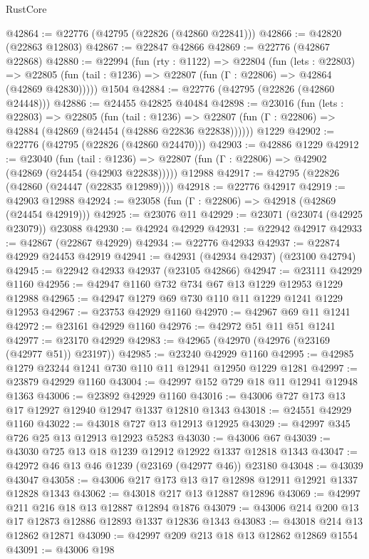 \begin{lexlean}{RustCore}
\begin{coremodule}
@42864 := @22776 (@42795 (@22826 (@42860 @22841)))
@42866 := @42820 (@22863 @12803)
@42867 := @22847 @42866
@42869 := @22776 (@42867 @22868)
@42880 := @22994
    (fun (rty : @1122) =>
    @22804
      (fun (lets : @22803) =>
      @22805 (fun (tail : @1236) => @22807 (fun (Γ : @22806) => @42864 (@42869 @42830)))))
    @1504
@42884 := @22776 (@42795 (@22826 (@42860 @24448)))
@42886 := @24455 @42825 @40484
@42898 := @23016
    (fun (lets : @22803) =>
    @22805
      (fun (tail : @1236) =>
      @22807 (fun (Γ : @22806) => @42884 (@42869 (@24454 (@42886 @22836 @22838))))))
    @1229
@42902 := @22776 (@42795 (@22826 (@42860 @24470)))
@42903 := @42886 @1229
@42912 := @23040
    (fun (tail : @1236) => @22807 (fun (Γ : @22806) => @42902 (@42869 (@24454 (@42903 @22838)))))
    @12988
@42917 := @42795 (@22826 (@42860 (@24447 (@22835 @12989))))
@42918 := @22776 @42917
@42919 := @42903 @12988
@42924 := @23058 (fun (Γ : @22806) => @42918 (@42869 (@24454 @42919)))
@42925 := @23076 @11
@42929 := @23071 (@23074 (@42925 @23079)) @23088
@42930 := @42924 @42929
@42931 := @22942 @42917
@42933 := @42867 (@22867 @42929)
@42934 := @22776 @42933
@42937 := @22874 @42929 @24453 @42919
@42941 := @42931 (@42934 @42937) (@23100 @42794)
@42945 := @22942 @42933 @42937 (@23105 @42866)
@42947 := @23111 @42929 @1160
@42956 := @42947 @1160 @732 @734 @67 @13 @1229 @12953 @1229 @12988
@42965 := @42947 @1279 @69 @730 @110 @11 @1229 @1241 @1229 @12953
@42967 := @23753 @42929 @1160
@42970 := @42967 @69 @11 @1241
@42972 := @23161 @42929 @1160
@42976 := @42972 @51 @11 @51 @1241
@42977 := @23170 @42929
@42983 := @42965 (@42970 (@42976 (@23169 (@42977 @51)) @23197))
@42985 := @23240 @42929 @1160
@42995 := @42985 @1279 @23244 @1241 @730 @110 @11 @12941 @12950 @1229 @1281
@42997 := @23879 @42929 @1160
@43004 := @42997 @152 @729 @18 @11 @12941 @12948 @1363
@43006 := @23892 @42929 @1160
@43016 := @43006 @727 @173 @13 @17 @12927 @12940 @12947 @1337 @12810 @1343
@43018 := @24551 @42929 @1160
@43022 := @43018 @727 @13 @12913 @12925
@43029 := @42997 @345 @726 @25 @13 @12913 @12923 @5283
@43030 := @43006 @67
@43039 := @43030 @725 @13 @18 @1239 @12912 @12922 @1337 @12818 @1343
@43047 := @42972 @46 @13 @46 @1239 (@23169 (@42977 @46)) @23180
@43048 := @43039 @43047
@43058 := @43006 @217 @173 @13 @17 @12898 @12911 @12921 @1337 @12828 @1343
@43062 := @43018 @217 @13 @12887 @12896
@43069 := @42997 @211 @216 @18 @13 @12887 @12894 @1876
@43079 := @43006 @214 @200 @13 @17 @12873 @12886 @12893 @1337 @12836 @1343
@43083 := @43018 @214 @13 @12862 @12871
@43090 := @42997 @209 @213 @18 @13 @12862 @12869 @1554
@43091 := @43006 @198

\end{coremodule}
\end{lexlean}
